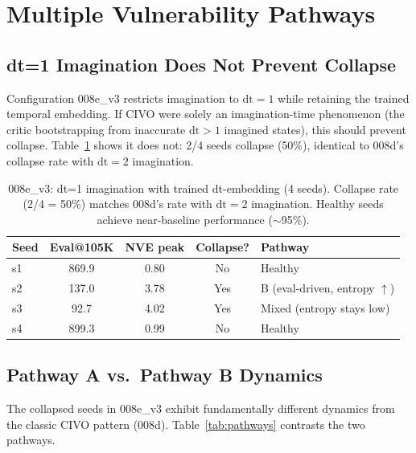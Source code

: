 \documentclass[10pt,letterpaper]{article}
\begin{document}
\section{Multiple Vulnerability Pathways}

\subsection{dt=1 Imagination Does Not Prevent Collapse}

Configuration 008e\_v3 restricts imagination to $\mathrm{dt}=1$ while retaining the trained temporal embedding.
If CIVO were solely an imagination-time phenomenon (the critic bootstrapping from inaccurate $\mathrm{dt}>1$ imagined states), this should prevent collapse.
Table~\ref{tab:dt1_imag} shows it does not: 2/4 seeds collapse (50\%), identical to 008d's collapse rate with $\mathrm{dt}=2$ imagination.

\begin{table}[h]
\centering
\caption{008e\_v3: dt=1 imagination with trained dt-embedding (4 seeds). Collapse rate (2/4 = 50\%) matches 008d's rate with $\mathrm{dt}=2$ imagination. Healthy seeds achieve near-baseline performance ($\sim$95\%).}
\label{tab:dt1_imag}
\small
\begin{tabular}{lcccl}
\toprule
Seed & Eval@105K & NVE peak & Collapse? & Pathway \\
\midrule
s1 & 869.9 & 0.80 & No & Healthy \\
s2 & 137.0 & 3.78 & Yes & B (eval-driven, entropy $\uparrow$) \\
s3 & 92.7 & 4.02 & Yes & Mixed (entropy stays low) \\
s4 & 899.3 & 0.99 & No & Healthy \\
\bottomrule
\end{tabular}
\end{table}

\subsection{Pathway A vs.\ Pathway B Dynamics}

The collapsed seeds in 008e\_v3 exhibit fundamentally different dynamics from the classic CIVO pattern (008d).
Table~\ref{tab:pathways} contrasts the two pathways.
\end{document}

